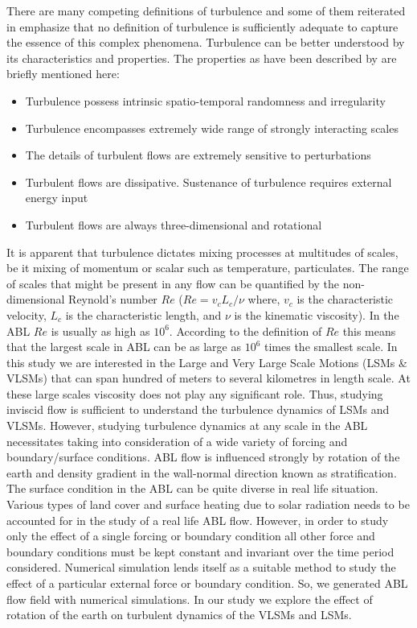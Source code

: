 There are many competing definitions of turbulence and some of them reiterated in \citep{hinze_book_75, tsinober_book_2001} emphasize that no definition of turbulence is sufficiently adequate to capture the essence of this complex phenomena. Turbulence can be better understood by its characteristics and properties. The properties as have been described by \citet[][]{tsinober_book_2001} are briefly mentioned here: 
\begin{itemize}
	\item Turbulence possess  intrinsic spatio-temporal randomness and irregularity
	\item Turbulence encompasses extremely wide range of strongly interacting scales
	\item The details of turbulent flows are extremely sensitive to perturbations 
	\item Turbulent flows are dissipative. Sustenance of turbulence requires external energy input
	\item Turbulent flows are always three-dimensional and rotational
\end{itemize}
It is apparent that turbulence dictates mixing processes at multitudes of scales, be it mixing of momentum or scalar such as temperature, particulates. The range of scales that might be present in any flow can be quantified by the non-dimensional Reynold's number $Re$ ($Re = v_c L_c/\nu$ where, $v_c$ is the characteristic velocity, $L_c$ is the characteristic length, and $\nu$ is the kinematic viscosity). In the ABL $Re$ is usually as high as $10^6$. According to the definition of $Re$ this means that the largest scale in ABL can be as large as $10^6$ times the smallest scale. In this study we are interested in the Large and Very Large Scale Motions (LSMs \& VLSMs) that can span hundred of meters to several kilometres in length scale. At these large scales viscosity does not play any significant role. Thus, studying inviscid flow is sufficient to understand the turbulence dynamics of LSMs and VLSMs. However, studying turbulence dynamics at any scale in the ABL necessitates taking into consideration of a wide variety of forcing and boundary/surface conditions. ABL flow is influenced strongly by rotation of the earth and density gradient in the wall-normal direction known as stratification. The surface condition in the ABL can be quite diverse in real life situation. Various types of land cover and surface heating due to solar radiation needs to be accounted for in the study of a real life ABL flow. However, in order to study only the effect of a single forcing or boundary condition all other force and boundary conditions must be kept constant and invariant over the time period considered. Numerical simulation lends itself as a suitable method to study the effect of a particular external force or boundary condition. So, we generated ABL flow field with numerical simulations. In our study we explore the effect of rotation of the earth on turbulent dynamics of the VLSMs and LSMs.    

